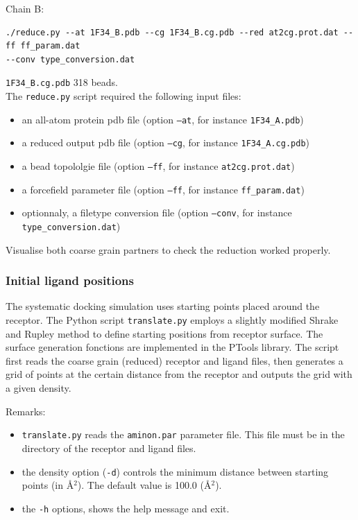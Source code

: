 \documentclass[12pt,a4paper]{article}
\begin{document}
Chain B:
\begin{verbatim}
./reduce.py --at 1F34_B.pdb --cg 1F34_B.cg.pdb --red at2cg.prot.dat --ff ff_param.dat 
--conv type_conversion.dat 
\end{verbatim}
{\tt 1F34\_B.cg.pdb} 318 beads. \\

The {\tt reduce.py} script required the following input files:

\begin{itemize}
\item an all-atom protein pdb file (option {\tt --at}, for instance {\tt 1F34\_A.pdb})
\item a reduced output pdb file (option {\tt --cg}, for instance {\tt 1F34\_A.cg.pdb})
\item a bead topololgie file (option {\tt --ff}, for instance {\tt at2cg.prot.dat})
\item a forcefield parameter file (option {\tt --ff}, for instance {\tt ff\_param.dat})
\item optionnaly, a filetype conversion file (option {\tt --conv}, for instance {\tt type\_conversion.dat})
\end{itemize}

Visualise both coarse grain partners to check the reduction worked properly.



\subsubsection{Initial ligand positions}

The systematic docking simulation uses starting points placed around the
receptor.  The Python script {\tt translate.py} employs a slightly modified
Shrake and Rupley \cite{shrake1973} method to define starting positions
from receptor surface.  The surface generation fonctions are implemented in
the PTools library. The script first reads the coarse grain (reduced)
receptor and ligand files, then generates a grid of points at the certain
distance from the receptor and outputs the grid with a given density.

Remarks:
\begin{itemize}
\item {\tt translate.py} reads the {\tt aminon.par} parameter file. This file must be
in the directory of the receptor and ligand files.
\item the density option ({\tt -d}) controls the minimum distance between starting
points (in \AA$^2$). The default value is 100.0 (\AA$^2$). 
\item the {\tt -h} options, shows the help message and exit.
\end{itemize}
\end{document}
